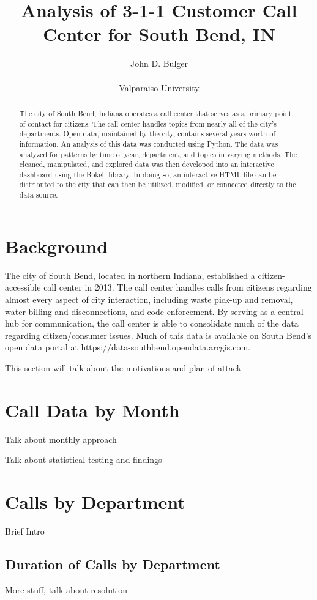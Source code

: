 \documentclass[11pt,twocolumn]{article}
\title{Analysis of 3-1-1 Customer Call Center for South Bend, IN}
\author{John D. Bulger\\
\\
Valparaiso University\\
}
\begin{document}
\maketitle
\begin{abstract}
The city of South Bend, Indiana operates a call center that serves as a primary point of contact for citizens.  The call center handles topics from nearly all of the city's departments.  Open data, maintained by the city, contains several years worth of information.  An analysis of this data was conducted using Python.  The data was 
analyzed for patterns by time of year, department, and topics in varying methods.  The cleaned, manipulated, and explored data was then developed into an 
interactive dashboard using the Bokeh library.  In doing so, an interactive HTML file can be distributed to the city that can then be utilized, modified, or connected 
directly to the data source.
\end{abstract}
\section{Background}
The city of South Bend, located in northern Indiana, established a citizen-accessible call center in 2013.  %
The call center handles calls from citizens regarding almost every aspect of city interaction, including waste pick-up and removal, water billing and disconnections, 
and code enforcement.  By serving as a central hub for communication, the call center is able to consolidate much of the data regarding citizen/consumer issues.  
Much of this data is available on South Bend's open data portal at https://data-southbend.opendata.arcgis.com.
\par
This section will talk about the motivations and plan of attack

\section{Call Data by Month}
Talk about monthly approach
\par
Talk about statistical testing and findings

\section{Calls by Department}
Brief Intro
\subsection{Duration of Calls by Department}
More stuff, talk about resolution
\end{document}
